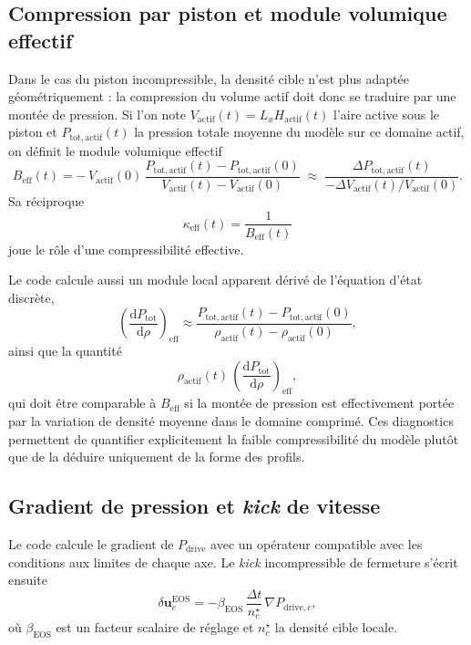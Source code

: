 \documentclass[11pt,a4paper]{article}
\begin{document}
\subsection{Compression par piston et module volumique effectif}

Dans le cas du piston incompressible, la densité cible n'est plus adaptée géométriquement : la compression du volume actif doit donc se traduire par une montée de pression. Si l'on note \(V_{\mathrm{actif}}(t)=L_x H_{\mathrm{actif}}(t)\) l'aire active sous le piston et \(P_{\mathrm{tot,actif}}(t)\) la pression totale moyenne du modèle sur ce domaine actif, on définit le module volumique effectif
\begin{equation}
 B_{\mathrm{eff}}(t)
 =
 -\,V_{\mathrm{actif}}(0)\,
 \frac{P_{\mathrm{tot,actif}}(t)-P_{\mathrm{tot,actif}}(0)}
 {V_{\mathrm{actif}}(t)-V_{\mathrm{actif}}(0)}
 \;\approx\;
 \frac{\Delta P_{\mathrm{tot,actif}}(t)}{-\Delta V_{\mathrm{actif}}(t)/V_{\mathrm{actif}}(0)}.
\end{equation}
Sa réciproque
\begin{equation}
 \kappa_{\mathrm{eff}}(t)=\frac{1}{B_{\mathrm{eff}}(t)}
\end{equation}
joue le rôle d'une compressibilité effective.

Le code calcule aussi un module local apparent dérivé de l'équation d'état discrète,
\begin{equation}
 \left(\frac{\mathrm d P_{\mathrm{tot}}}{\mathrm d \rho}\right)_{\mathrm{eff}}
 \approx
 \frac{P_{\mathrm{tot,actif}}(t)-P_{\mathrm{tot,actif}}(0)}
 {\rho_{\mathrm{actif}}(t)-\rho_{\mathrm{actif}}(0)},
\end{equation}
ainsi que la quantité
\begin{equation}
 \rho_{\mathrm{actif}}(t)\,
 \left(\frac{\mathrm d P_{\mathrm{tot}}}{\mathrm d \rho}\right)_{\mathrm{eff}},
\end{equation}
qui doit être comparable à \(B_{\mathrm{eff}}\) si la montée de pression est effectivement portée par la variation de densité moyenne dans le domaine comprimé. Ces diagnostics permettent de quantifier explicitement la faible compressibilité du modèle plutôt que de la déduire uniquement de la forme des profils.

\subsection{Gradient de pression et \emph{kick} de vitesse}

Le code calcule le gradient de $P_{\mathrm{drive}}$ avec un opérateur compatible avec les conditions aux limites de chaque axe. Le \emph{kick} incompressible de fermeture s'écrit ensuite
\begin{equation}
 \delta \bm{u}_c^{\mathrm{EOS}} = -\beta_{\mathrm{EOS}}\,\frac{\Delta t}{n_c^{\star}}\,\nabla P_{\mathrm{drive},c},
\end{equation}
où $\beta_{\mathrm{EOS}}$ est un facteur scalaire de réglage et $n_c^{\star}$ la densité cible locale.
\end{document}
